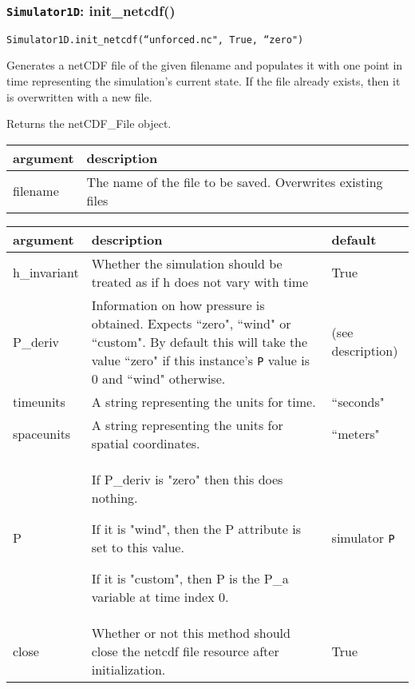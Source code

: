 \documentclass[10pt,a4paper]{article}
\newenvironment{arglist}
    {\begin{center}
    \begin{tabular}{l|p{12cm}}
    argument & description\\
    \hline
    }
    { 
    \end{tabular} 
    \end{center}
    }
\newenvironment{optarglist}
    {\begin{center}
    \begin{tabular}{l|p{10cm}|l}
    argument & description & default\\
    \hline
    }
    { 
    \end{tabular} 
    \end{center}
    }
\begin{document}
\subsubsection{\texttt{Simulator1D}: init\_netcdf()}
\texttt{Simulator1D.init\_netcdf(``unforced.nc", True, ``zero")}


        Generates a netCDF file of the given filename and populates it with
        one point in time representing the simulation's current state. If the file
already exists, then it is overwritten with a new file.

        Returns the netCDF\_File object.

\begin{arglist}
        filename
                  & The name of the file to be saved. Overwrites existing files
\end{arglist}

\begin{optarglist}

        h\_invariant
                  & Whether the simulation should be treated as if h does not
                    vary with time & True \\\hline
        P\_deriv
                  & Information on how pressure is obtained. Expects ``zero",
                    ``wind" or ``custom". 
By default this will take the value ``zero" if this instance's \texttt{P} value is 0 and ``wind" otherwise. & (see description) \\\hline
        timeunits    
              & A string representing the units for time. & ``seconds" \\\hline

        spaceunits
              &A string representing the units for spatial coordinates. & ``meters" \\\hline

        P
              &If P\_deriv is "zero" then this does nothing.

                    If it is "wind", then the P attribute is set to this value.

                    If it is "custom", then P is the P\_a variable at time index 0. & simulator \texttt{P}\\\hline
        
        close
             & Whether or not this method should close the netcdf file
                    resource after initialization. &  True
\end{optarglist}
\end{document}
